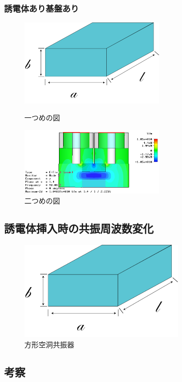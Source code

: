 \subsubsection{誘電体あり基盤あり}
\begin{figure}[h]
 \begin{minipage}{0.5\hsize}
  \begin{center}
   \includegraphics[width=70mm]{./image/空洞共振器.png}
  \end{center}
  \caption{一つめの図}
  \label{fig:one}
 \end{minipage}
 \begin{minipage}{0.5\hsize}
  \begin{center}
   \includegraphics[width=70mm]{./image/model73_y_x.png}
  \end{center}
  \caption{二つめの図}
  \label{fig:two}
 \end{minipage}
\end{figure}

\subsection{誘電体挿入時の共振周波数変化}

\vspace{10 mm}

\begin{figure}[h]
  \begin{center}
    \includegraphics[width=8cm]{./image/空洞共振器.png}
    \caption{方形空洞共振器}
    \label{fig:Cavity}
  \end{center}
\end{figure}

\subsection{考察}
